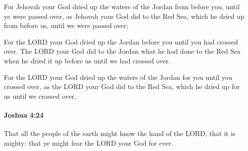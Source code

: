 			\begin{versebox}
					\item[BHS] 
					\item[ASV] For Jehovah your God dried up the waters of the Jordan from before you, until ye were passed over, as Jehovah your God did to the Red Sea, which he dried up from before us, until we were passed over;
					\item[NIV] For the LORD your God dried up the Jordan before you until you had crossed over. The LORD your God did to the Jordan what he had done to the Red Sea when he dried it up before us until we had crossed over.
					\item[NRSV] For the LORD your God dried up the waters of the Jordan for you until you crossed over, as the LORD your God did to the Red Sea, which he dried up for us until we crossed over,
			\end{versebox}

		\paragraph{Joshua 4:24} %
			\label{JOSHUA-4-24}

			That all the people of the earth might know the hand of the LORD, that it is mighty: that ye might fear the LORD your God for ever.

